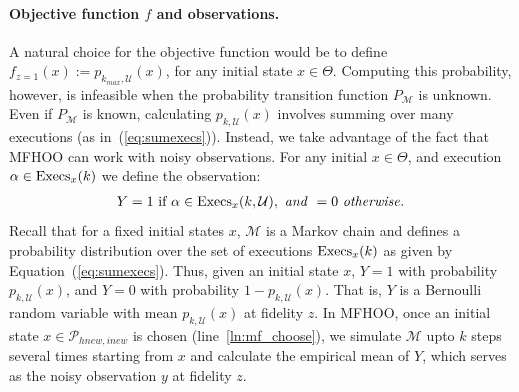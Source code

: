 \documentclass[11pt]{article}
\theoremstyle{definition}
\newcommand{\sayan}[1]{\textcolor{blue}{#1}}
\newcommand{\M}{\mathcal{M}}
\newcommand{\phit}[3]{{p_{#1,#2}{(#3)}}}
\newcommand{\Observ}{Y}
\newcommand{\Unsafe}{\mathcal{U}}
\newcommand{\execs}[1]{{{\rm{Execs}}_{#1}}}
\newcommand{\partition}[2]{{\mathcal{P}_{#1,#2}}}
\begin{document}
\paragraph{Objective function $f$ and observations.}
A natural choice for the objective function  would be to define $f_{z=1}(x) := \phit{k_{max}}{\Unsafe}{x}$, for any initial state $x \in \Theta$.
Computing this  probability, however, is infeasible when the probability transition function $P_\M$ is unknown. Even if $P_\M$ is known, calculating $\phit{k}{\Unsafe}{x}$ involves summing over  many executions (as in~(\ref{eq:sumexecs})).
%
Instead, we take advantage of the fact that MFHOO can work with noisy observations. For any initial  $x \in \Theta$, and execution $\alpha \in \execs{x}(k)$ we define the observation:
\begin{align}
\Observ = 1 \ \mbox{if} \ \alpha \in \execs{x}(k,\Unsafe), \ \mathit{and} \ = 0 \ \mathit{otherwise}.
\end{align}
%
Recall that for a fixed initial states $x$, $\M$ is a Markov chain and defines a probability distribution over the set of executions $\execs{x}(k)$ as given by Equation~(\ref{eq:sumexecs}).
Thus, given an initial state $x$,
$\Observ=1$ with probability $\phit{k}{\Unsafe}{x}$, and $\Observ=0$ with probability $1-\phit{k}{\Unsafe}{x}$.
%
%
That is, $\Observ$ is a Bernoulli random variable with mean $\phit{k}{\Unsafe}{x}$ at fidelity $z$.
In  MFHOO, once an initial state $x \in \partition{\mathit{hnew}}{\mathit{inew}}$ is chosen (line~\ref{ln:mf_choose}), we simulate $\M$ upto $k$ steps several times  starting from $x$  and calculate the empirical mean of $Y$, which serves as the noisy observation $y$ at fidelity $z$.



\end{document}
